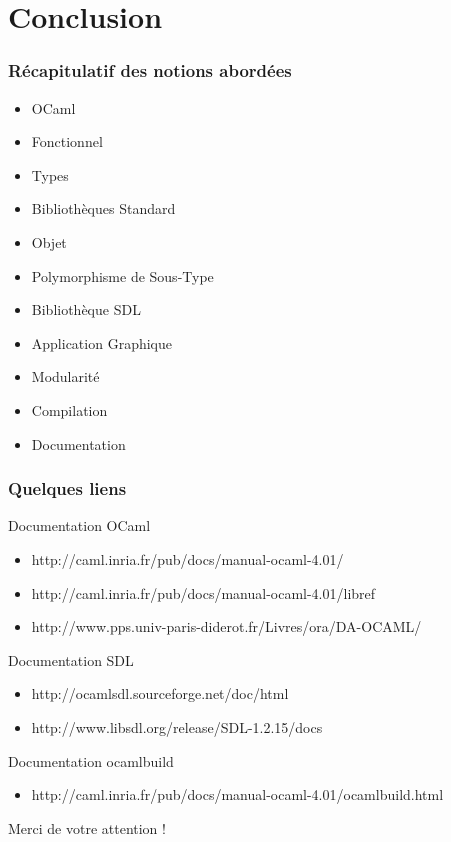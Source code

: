\section*{Conclusion}

\begin{frame}
	\frametitle{Récapitulatif des notions abordées}
	\large
        \begin{itemize}
            \item OCaml
            \item Fonctionnel
            \item Types
            \item Bibliothèques Standard
            \item Objet
            \item Polymorphisme de Sous-Type
            \item Bibliothèque SDL
            \item Application Graphique
            \item Modularité
            \item Compilation
            \item Documentation
        \end{itemize}
\end{frame}

\begin{frame}
	\frametitle{Quelques liens}
	\begin{block}{Documentation OCaml}
		\begin{itemize}
			\item http://caml.inria.fr/pub/docs/manual-ocaml-4.01/
			\item http://caml.inria.fr/pub/docs/manual-ocaml-4.01/libref

			\item http://www.pps.univ-paris-diderot.fr/Livres/ora/DA-OCAML/
		\end{itemize}
	\end{block}
	\begin{block}{Documentation SDL}
		\begin{itemize}
			\item http://ocamlsdl.sourceforge.net/doc/html
			\item http://www.libsdl.org/release/SDL-1.2.15/docs
		\end{itemize}
	\end{block}
	\begin{block}{Documentation ocamlbuild}
		\begin{itemize}
			\item http://caml.inria.fr/pub/docs/manual-ocaml-4.01/ocamlbuild.html
		\end{itemize}
	\end{block}
\end{frame}

\begin{frame}
    \begin{center}
    Merci de votre attention !
    \end{center}
\end{frame}

